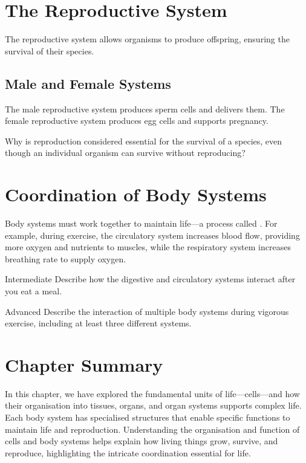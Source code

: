 
\section{The Reproductive System}

The reproductive system allows organisms to produce offspring, ensuring the survival of their species.

\subsection{Male and Female Systems}

The male reproductive system produces sperm cells and delivers them. The female reproductive system produces egg cells and supports pregnancy.

\begin{stopandthink}
Why is reproduction considered essential for the survival of a species, even though an individual organism can survive without reproducing?
\end{stopandthink}

\section{Coordination of Body Systems}

Body systems must work together to maintain life—a process called . For example, during exercise, the circulatory system increases blood flow, providing more oxygen and nutrients to muscles, while the respiratory system increases breathing rate to supply oxygen.

\begin{tieredquestions}{Intermediate}
Describe how the digestive and circulatory systems interact after you eat a meal.
\end{tieredquestions}

\begin{tieredquestions}{Advanced}
Describe the interaction of multiple body systems during vigorous exercise, including at least three different systems.
\end{tieredquestions}

\section{Chapter Summary}

In this chapter, we have explored the fundamental units of life—cells—and how their organisation into tissues, organs, and organ systems supports complex life. Each body system has specialised structures that enable specific functions to maintain life and reproduction. Understanding the organisation and function of cells and body systems helps explain how living things grow, survive, and reproduce, highlighting the intricate coordination essential for life.